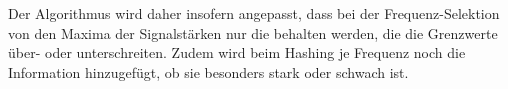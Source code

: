         Der Algorithmus wird daher insofern angepasst, dass bei der Frequenz-Selektion von den Maxima der Signalstärken nur die behalten werden, die die Grenzwerte über- oder unterschreiten. Zudem wird beim Hashing je Frequenz noch die Information hinzugefügt, ob sie besonders stark oder schwach ist.
    
